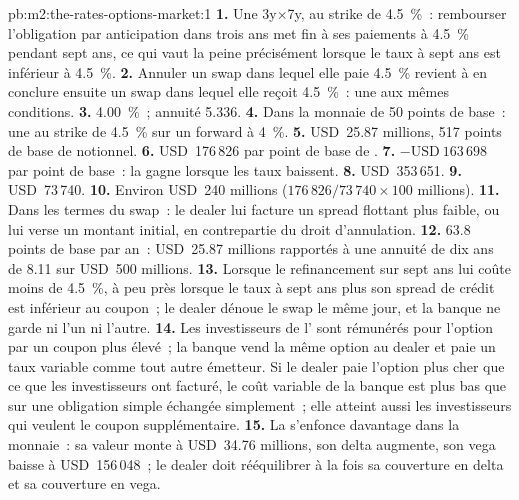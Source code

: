 \begin{solution}{pb:m2:the-rates-options-market:1}
\textbf{1.} Une  3y$\times$7y, au strike de 4.5~\%~: rembourser l'obligation par anticipation dans
trois ans met fin à ses paiements à 4.5~\% pendant sept ans, ce qui vaut la peine
précisément lorsque le taux à sept ans est inférieur à 4.5~\%.
\textbf{2.} Annuler un swap dans lequel elle paie 4.5~\% revient à en conclure ensuite un
swap dans lequel elle reçoit 4.5~\%~: une  aux mêmes conditions.
\textbf{3.} 4.00~\%~; annuité 5.336.
\textbf{4.} Dans la monnaie de 50 points de base~: une  au strike de 4.5~\% sur un
forward à 4~\%.
\textbf{5.} USD~25.87 millions, 517 points de base de notionnel.
\textbf{6.} USD~176\,826 par point de base de .
\textbf{7.} $-\text{USD}~163\,698$ par point de base~: la  gagne lorsque les taux
baissent.
\textbf{8.} USD~353\,651.
\textbf{9.} USD~73\,740.
\textbf{10.} Environ USD~240 millions ($176\,826/73\,740 \times 100$ millions).
\textbf{11.} Dans les termes du swap~: le dealer lui facture un spread flottant plus faible,
ou lui verse un montant initial, en contrepartie du droit d'annulation.
\textbf{12.} 63.8 points de base par an~: USD~25.87 millions rapportés à une annuité de dix
ans de 8.11 sur USD~500 millions.
\textbf{13.} Lorsque le refinancement sur sept ans lui coûte moins de 4.5~\%, à peu près
lorsque le taux à sept ans plus son spread de crédit est inférieur au coupon~; le dealer
dénoue le swap le même jour, et la banque ne garde ni l'un ni l'autre.
\textbf{14.} Les investisseurs de l' sont rémunérés pour l'option par un coupon plus
élevé~; la banque vend la même option au dealer et paie un taux variable comme tout
autre émetteur. Si le dealer paie l'option plus cher que ce que les investisseurs
ont facturé, le coût variable de la banque est plus bas que sur une obligation simple
échangée simplement~; elle atteint aussi les investisseurs qui veulent le coupon supplémentaire.
\textbf{15.} La  s'enfonce davantage dans la monnaie~: sa valeur monte à
USD~34.76 millions, son delta augmente, son vega baisse à USD~156\,048~; le dealer
doit rééquilibrer à la fois sa couverture en delta et sa couverture en vega.

\end{solution}
